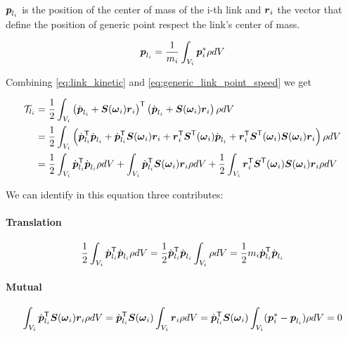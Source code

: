 $\boldsymbol{p}_{l_i}$ is the position of the center of mass of the i-th link and $\boldsymbol{r}_i$ the vector that define the position of generic point respect the link's center of mass.

\begin{equation}
    \boldsymbol{p}_{l_i} = \frac{1}{m_i} \int_{V_i} \boldsymbol{p}_i^* \rho dV \label{eq:center_mass}
\end{equation}

Combining \autoref{eq:link_kinetic} and \autoref{eq:generic_link_point_speed} we get

\begin{align*}
	\mathcal{T}_{l_i} &= \frac{1}{2} \int_{V_i}
	\left(\dot{\boldsymbol{p}}_{l_i} +\boldsymbol{S}(\boldsymbol{\omega}_i) \boldsymbol{r}_i\right)^{\mathsf{T}}
	\left(\dot{\boldsymbol{p}}_{l_i} + \boldsymbol{S}(\boldsymbol{\omega}_i) \boldsymbol{r}_i\right) \rho dV \\
	&= \frac{1}{2} \int_{V_i} \left(
	\dot{\boldsymbol{p}}_{l_i}^{\mathsf{T}} \dot{\boldsymbol{p}}_{l_i} +
	\dot{\boldsymbol{p}}_{l_i}^{\mathsf{T}} \boldsymbol{S}(\boldsymbol{\omega}_i) \boldsymbol{r}_i +
	\boldsymbol{r}_i^{\mathsf{T}} \boldsymbol{S}^{\mathsf{T}}(\boldsymbol{\omega}_i)  \dot{\boldsymbol{p}}_{l_i} +
	\boldsymbol{r}_i^{\mathsf{T}} \boldsymbol{S}^{\mathsf{T}}(\boldsymbol{\omega}_i) \boldsymbol{S}(\boldsymbol{\omega}_i) \boldsymbol{r}_i
	\right) \rho dV \\
	&=
	\frac{1}{2} \int_{V_i} \dot{\boldsymbol{p}}_{l_i}^{\mathsf{T}} \dot{\boldsymbol{p}}_{l_i} \rho dV +
	\int_{V_i} \dot{\boldsymbol{p}}_{l_i}^{\mathsf{T}} \boldsymbol{S}(\boldsymbol{\omega}_i) \boldsymbol{r}_i \rho dV +
	\frac{1}{2} \int_{V_i} \boldsymbol{r}_i^{\mathsf{T}} \boldsymbol{S}^{\mathsf{T}}(\boldsymbol{\omega}_i) \boldsymbol{S}(\boldsymbol{\omega}_i) \boldsymbol{r}_i \rho dV
\end{align*}

We can identify in this equation three contributes:

\paragraph{Translation}

\[
	\frac{1}{2} \int_{V_i} \dot{\boldsymbol{p}}_{l_i}^{\mathsf{T}} \dot{\boldsymbol{p}}_{l_i} \rho dV =
	\frac{1}{2} \dot{\boldsymbol{p}}_{l_i}^{\mathsf{T}} \dot{\boldsymbol{p}}_{l_i} \int_{V_i} \rho dV =
	\frac{1}{2} m_i \dot{\boldsymbol{p}}_{l_i}^{\mathsf{T}} \dot{\boldsymbol{p}}_{l_i}
\]

\paragraph{Mutual}

\[
	\int_{V_i} \dot{\boldsymbol{p}}_{l_i}^{\mathsf{T}} \boldsymbol{S}(\boldsymbol{\omega}_i) \boldsymbol{r}_i \rho dV =
	\dot{\boldsymbol{p}}_{l_i}^{\mathsf{T}} \boldsymbol{S}(\boldsymbol{\omega}_i) \int_{V_i} \boldsymbol{r}_i \rho dV =
	\dot{\boldsymbol{p}}_{l_i}^{\mathsf{T}} \boldsymbol{S}(\boldsymbol{\omega}_i) \int_{V_i} (\boldsymbol{p}_i^* - \boldsymbol{p}_{l_i}) \rho dV = 0
\]

